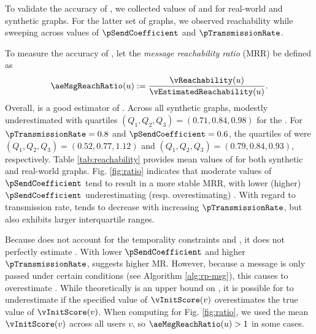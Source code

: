 To validate the accuracy of , we collected values of  and  for real-world and synthetic graphs. For the latter set of graphs, we observed reachability while sweeping across values of $\pSendCoefficient$ and $\pTransmissionRate$.

To measure the accuracy of , let the \emph{message reachability ratio} (MRR) be defined as
\begin{equation}\label{eq:mrr}
	\aeMsgReachRatio(u) := \frac{\vReachability(u)}{\vEstimatedReachability(u)}.
\end{equation}
Overall,  is a good estimator of . Across all synthetic graphs,  modestly underestimated  with quartiles $(Q_1, Q_2, Q_3) = (0.71, 0.84, 0.98)$ for the . For $\pTransmissionRate = 0.8$ and $\pSendCoefficient = 0.6$, the quartiles of  were $(Q_1, Q_2, Q_3) = (0.52, 0.77, 1.12)$ and $(Q_1, Q_2, Q_3) = (0.79, 0.84, 0.93)$, respectively. Table \ref{tab:reachability} provides mean values of  for both synthetic and real-world graphs. Fig. \ref{fig:ratio} indicates that moderate values of $\pSendCoefficient$ tend to result in a more stable MRR, with lower (higher) $\pSendCoefficient$ underestimating (resp. overestimating) . With regard to transmission rate,  tends to decrease with increasing $\pTransmissionRate$, but also exhibits larger interquartile ranges.

Because  does not account for the temporality constraints  and , it does not perfectly estimate . With lower $\pSendCoefficient$ and higher $\pTransmissionRate$,  suggests higher MR. However, because a message is only passed under certain conditions (see Algorithm \ref{alg:rp-msg}), this causes  to overestimate . While  theoretically is an upper bound on , it is possible for  to underestimate  if the specified value of $\vInitScore(v)$ overestimates the true value of $\vInitScore(v)$. When computing  for Fig. \ref{fig:ratio}, we used the mean $\vInitScore(v)$ across all users $v$, so $\aeMsgReachRatio(u) > 1$ in some cases.

